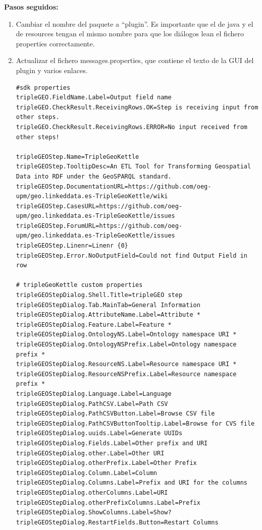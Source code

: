 \textbf{Pasos seguidos:}

\begin{enumerate}
    \item Cambiar el nombre del paquete a ``plugin''. Es importante que el de java y el de resources tengan el
        mismo nombre para que los diálogos lean el fichero properties correctamente.

    \item Actualizar el fichero messages.properties, que contiene el texto de la GUI del plugin y varios enlaces.
\begin{lstlisting}
#sdk properties
tripleGEO.FieldName.Label=Output field name
tripleGEO.CheckResult.ReceivingRows.OK=Step is receiving input from other steps.
tripleGEO.CheckResult.ReceivingRows.ERROR=No input received from other steps!

tripleGEOStep.Name=TripleGeoKettle
tripleGEOStep.TooltipDesc=An ETL Tool for Transforming Geospatial Data into RDF under the GeoSPARQL standard.
tripleGEOStep.DocumentationURL=https://github.com/oeg-upm/geo.linkeddata.es-TripleGeoKettle/wiki
tripleGEOStep.CasesURL=https://github.com/oeg-upm/geo.linkeddata.es-TripleGeoKettle/issues
tripleGEOStep.ForumURL=https://github.com/oeg-upm/geo.linkeddata.es-TripleGeoKettle/issues
tripleGEOStep.Linenr=Linenr {0}
tripleGEOStep.Error.NoOutputField=Could not find Output Field in row

# tripleGeoKettle custom properties
tripleGEOStepDialog.Shell.Title=tripleGEO step
tripleGEOStepDialog.Tab.MainTab=General Information
tripleGEOStepDialog.AttributeName.Label=Attribute *
tripleGEOStepDialog.Feature.Label=Feature *
tripleGEOStepDialog.OntologyNS.Label=Ontology namespace URI *
tripleGEOStepDialog.OntologyNSPrefix.Label=Ontology namespace prefix *
tripleGEOStepDialog.ResourceNS.Label=Resource namespace URI *
tripleGEOStepDialog.ResourceNSPrefix.Label=Resource namespace prefix *
tripleGEOStepDialog.Language.Label=Language
tripleGEOStepDialog.PathCSV.Label=Path CSV
tripleGEOStepDialog.PathCSVButton.Label=Browse CSV file
tripleGEOStepDialog.PathCSVButtonTooltip.Label=Browse for CVS file
tripleGEOStepDialog.uuids.Label=Generate UUIDs
tripleGEOStepDialog.Fields.Label=Other prefix and URI
tripleGEOStepDialog.other.Label=Other URI
tripleGEOStepDialog.otherPrefix.Label=Other Prefix
tripleGEOStepDialog.Column.Label=Column
tripleGEOStepDialog.Columns.Label=Prefix and URI for the columns
tripleGEOStepDialog.otherColumns.Label=URI
tripleGEOStepDialog.otherPrefixColumns.Label=Prefix
tripleGEOStepDialog.ShowColumns.Label=Show?
tripleGEOStepDialog.RestartFields.Button=Restart Columns
\end{lstlisting}


\end{enumerate}
